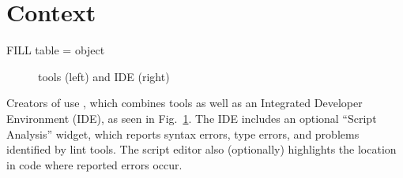 \documentclass[
  acmsmall,
  review,
]{acmart}
\begin{document}
\section{ Context}

FILL table = object

\begin{figure}
  \caption{ tools (left) and IDE (right)}
  \label{fig:roblox-studio}
\end{figure}
      
Creators of  use ,
which combines  tools as well as an Integrated
Developer Environment (IDE), as seen in Fig.~\ref{fig:roblox-studio}.
The IDE includes an optional ``Script Analysis'' widget, which
reports syntax errors, type errors, and problems identified by
lint tools. The script editor also (optionally) highlights
the location in code where reported errors occur.
\end{document}
